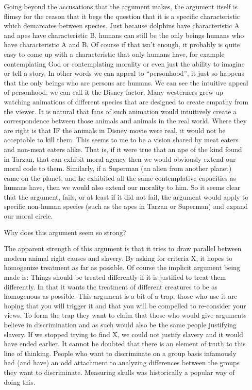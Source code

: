 Going beyond the accusations that the argument makes, the argument itself is flimsy for the reason that it begs the question that it is a specific characteristic which demarcates between species. Just because dolphins have characteristic A and apes have characteristic B, humans can still be the only beings humans who have characteristic A and B. Of course if that isn’t enough, it probably is quite easy to come up with a characteristic that only humans have, for example contemplating God or contemplating morality or even just the ability to imagine or tell a story. In other words we can appeal to “personhood”, it just so happens that the only beings who are persons are humans.
We can see the intuitive appeal of personhood; we can call it the Disney factor. Many westerners grew up watching animations of different species that are designed to create empathy from the viewer. It is natural that fans of such animation would intuitively create a correspondence between those animals and animals in the real world. Where they are right is that IF the animals in Disney movie were real, it would not be acceptable to kill them. This seems to me to be a vision shared by meat eaters and non-meat eaters alike. That is, if it were true that an ape of the kind found in Tarzan, that can exhibit moral agency then we would obviously extend our moral code to them. Similarly, if a Superman (an alien from another planet) came on the planet, and he exhibited all the same contemplative capacities as humans have, then we would also extend our morality to him.
So it seems clear that the argument, fails, or at least if it did not fail, the argument would apply to specific non-human species (such as the apes in Tarzan or Superman) and expand our moral circle.

Why does this argument seem so strong?

The apparent strength of this argument is that it tries to draw parallel between modern animal right causes and slavery. By asking for criteria X, it hopes to homogenize treatment as far as possible. Of course the implicit argument being made is:
Things should be treated differently if it is justified to treat them differently. 
In that it wants the treatment of different creatures to be as homogenous as possible. This argument is a bit of a trap, those who use it are hoping that you will trigger it and that you will be compelled to re-consider your views.
To form the trap they want to claim that those who would give-arguments believe in discrimination and as such would also be the same people justifying slavery. If we stopped trying to find X, we could not justify slavery and it would have ended earlier. 
It cannot be doubted that there is an element of truth to this line of thinking. People who want to discriminate on a group basis infamously had (and have) an odd attachment to analyzing differences between the groups they want to discriminate. Measuring skulls was historically a popular way of doing this.


